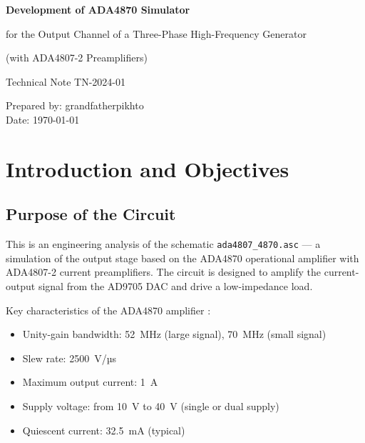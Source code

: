 \documentclass[a4paper, 12pt]{article}
\begin{document}
\begin{titlepage}
\centering
\vspace{0.75cm}
{\Huge\bfseries Development of ADA4870 Simulator\par}
\vspace{0.25cm}
{\Large for the Output Channel of a Three-Phase High-Frequency Generator\par}
\vspace{0.25cm}
{\large (with ADA4807-2 Preamplifiers)\par}
\vspace{1.5cm}
{\large Technical Note TN-2024-01\par}
\vspace{2cm}
\vfill
\begin{flushright}
Prepared by: grandfatherpikhto\\
Date: \today
\end{flushright}
\vspace{1cm}
\end{titlepage}

\newpage
\tableofcontents
\newpage

\section{Introduction and Objectives}

\subsection{Purpose of the Circuit}

\par This is an engineering analysis of the schematic \texttt{ada4807\_4870.asc} ---
a simulation of the output stage based on the ADA4870 operational amplifier
with ADA4807-2 current preamplifiers. The circuit is designed to amplify the
current-output signal from the AD9705 DAC and drive a low-impedance load.

Key characteristics of the ADA4870 amplifier \cite{ADA4870_ds}:
\begin{itemize}
  \item Unity-gain bandwidth: 52~MHz (large signal),
        70~MHz (small signal)
  \item Slew rate: 2500~V/µs
  \item Maximum output current: 1~A
  \item Supply voltage: from 10~V to 40~V (single or dual supply)
  \item Quiescent current: 32.5~mA (typical)
\end{itemize}
\end{document}
